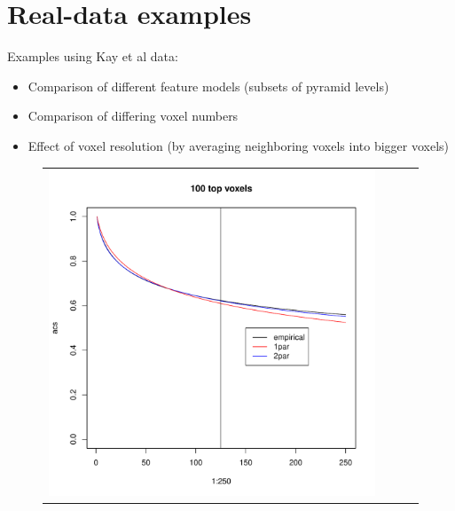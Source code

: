 \documentclass[12pt]{article}
\begin{document}
\section{Real-data examples}

Examples using Kay et al data:
\begin{itemize}
\item Comparison of different feature models (subsets of pyramid levels)
\item Comparison of differing voxel numbers
\item Effect of voxel resolution (by averaging neighboring voxels into bigger voxels)
\end{itemize}


\begin{figure}
\begin{center}
\begin{tabular}{cccc}
\includegraphics[scale=0.3]{../Yuval/ident_extrap1.pdf} &

\end{tabular}
\end{center}
\end{figure}
\end{document}
